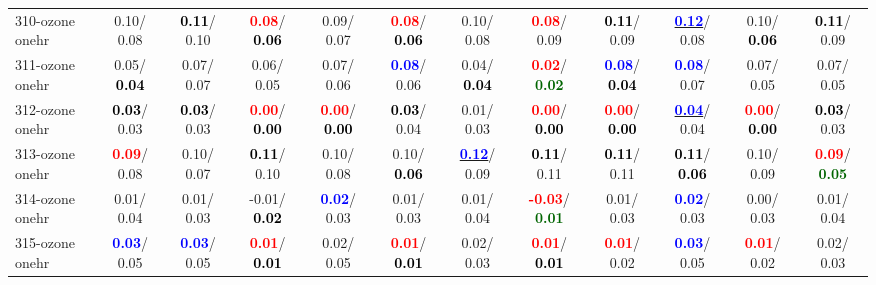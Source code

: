 \begin{table}[h]
\begin{center}
{\begin{tabular}{lc|c|c|c|c|c|c|c|c|c|c}
310-ozone onehr &   0.10/  0.08 & \textcolor{black}{\textbf{  0.11}}/  0.10 & \textcolor{red}{\textbf{  0.08}}/\textcolor{black}{\textbf{  0.06}} &   0.09/  0.07 & \textcolor{red}{\textbf{  0.08}}/\textcolor{black}{\textbf{  0.06}} &   0.10/  0.08 & \textcolor{red}{\textbf{  0.08}}/  0.09 & \textcolor{black}{\textbf{  0.11}}/  0.09 & \underline{\textcolor{blue}{\textbf{  0.12}}}/  0.08 &   0.10/\textcolor{black}{\textbf{  0.06}} & \textcolor{black}{\textbf{  0.11}}/  0.09 \\
311-ozone onehr &   0.05/\textcolor{black}{\textbf{  0.04}} &   0.07/  0.07 &   0.06/  0.05 &   0.07/  0.06 & \textcolor{blue}{\textbf{  0.08}}/  0.06 &   0.04/\textcolor{black}{\textbf{  0.04}} & \textcolor{red}{\textbf{  0.02}}/\textcolor{darkgreen}{\textbf{  0.02}} & \textcolor{blue}{\textbf{  0.08}}/\textcolor{black}{\textbf{  0.04}} & \textcolor{blue}{\textbf{  0.08}}/  0.07 &   0.07/  0.05 &   0.07/  0.05 \\
312-ozone onehr & \textcolor{black}{\textbf{  0.03}}/  0.03 & \textcolor{black}{\textbf{  0.03}}/  0.03 & \textcolor{red}{\textbf{  0.00}}/\textcolor{black}{\textbf{  0.00}} & \textcolor{red}{\textbf{  0.00}}/\textcolor{black}{\textbf{  0.00}} & \textcolor{black}{\textbf{  0.03}}/  0.04 &   0.01/  0.03 & \textcolor{red}{\textbf{  0.00}}/\textcolor{black}{\textbf{  0.00}} & \textcolor{red}{\textbf{  0.00}}/\textcolor{black}{\textbf{  0.00}} & \underline{\textcolor{blue}{\textbf{  0.04}}}/  0.04 & \textcolor{red}{\textbf{  0.00}}/\textcolor{black}{\textbf{  0.00}} & \textcolor{black}{\textbf{  0.03}}/  0.03 \\
313-ozone onehr & \textcolor{red}{\textbf{  0.09}}/  0.08 &   0.10/  0.07 & \textcolor{black}{\textbf{  0.11}}/  0.10 &   0.10/  0.08 &   0.10/\textcolor{black}{\textbf{  0.06}} & \underline{\textcolor{blue}{\textbf{  0.12}}}/  0.09 & \textcolor{black}{\textbf{  0.11}}/  0.11 & \textcolor{black}{\textbf{  0.11}}/  0.11 & \textcolor{black}{\textbf{  0.11}}/\textcolor{black}{\textbf{  0.06}} &   0.10/  0.09 & \textcolor{red}{\textbf{  0.09}}/\textcolor{darkgreen}{\textbf{  0.05}} \\
314-ozone onehr &   0.01/  0.04 &   0.01/  0.03 &  -0.01/\textcolor{black}{\textbf{  0.02}} & \textcolor{blue}{\textbf{  0.02}}/  0.03 &   0.01/  0.03 &   0.01/  0.04 & \textcolor{red}{\textbf{ -0.03}}/\textcolor{darkgreen}{\textbf{  0.01}} &   0.01/  0.03 & \textcolor{blue}{\textbf{  0.02}}/  0.03 &   0.00/  0.03 &   0.01/  0.04 \\
315-ozone onehr & \textcolor{blue}{\textbf{  0.03}}/  0.05 & \textcolor{blue}{\textbf{  0.03}}/  0.05 & \textcolor{red}{\textbf{  0.01}}/\textcolor{black}{\textbf{  0.01}} &   0.02/  0.05 & \textcolor{red}{\textbf{  0.01}}/\textcolor{black}{\textbf{  0.01}} &   0.02/  0.03 & \textcolor{red}{\textbf{  0.01}}/\textcolor{black}{\textbf{  0.01}} & \textcolor{red}{\textbf{  0.01}}/  0.02 & \textcolor{blue}{\textbf{  0.03}}/  0.05 & \textcolor{red}{\textbf{  0.01}}/  0.02 &   0.02/  0.03 \\

\end{tabular}}
\end{center}
\end{table}
